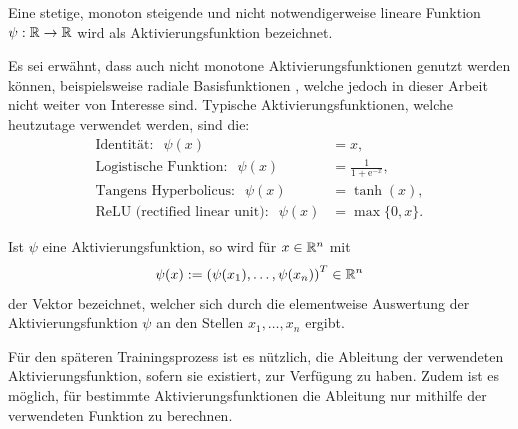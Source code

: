 \begin{defi}[Aktivierungsfunktion]
    \label{def_act_f}
    Eine stetige, monoton steigende und nicht notwendigerweise lineare Funktion $\psi: \mathbb{R} \rightarrow \mathbb{R}$ wird als Aktivierungsfunktion bezeichnet.
\end{defi}
Es sei erwähnt, dass auch nicht monotone Aktivierungsfunktionen genutzt werden können, beispielsweise radiale Basisfunktionen \cite{radialbasis}, welche jedoch in dieser Arbeit nicht weiter von Interesse sind.
Typische Aktivierungsfunktionen, welche heutzutage verwendet werden, sind die:
\begin{align*}
    \text{Identität}: \; \;\psi(x)&=x, \\
    \text{Logistische Funktion}: \; \;\psi(x)&=\frac{1}{1+\mathrm{e}^{-x}}, \\
    \text{Tangens Hyperbolicus}: \; \;\psi(x)&=\tanh(x), \\
    \text{ReLU (rectified linear unit)}: \; \;\psi(x)&=\max\{0,x\}.
\end{align*}

\begin{bem}
    Ist $\psi$ eine Aktivierungsfunktion, so wird für $x \in \mathbb{R}^n$ mit 
    \[\psi(x):=\left(\psi(x_1), \ldots, \psi(x_n)\right)^T \in \mathbb{R}^n
    \]
    der Vektor bezeichnet, welcher sich durch die elementweise Auswertung der Aktivierungsfunktion $\psi$ an den Stellen $x_1, \ldots, x_n$ ergibt. 
\end{bem}



Für den späteren Trainingsprozess ist es nützlich, die Ableitung der verwendeten Aktivierungsfunktion, sofern sie existiert, zur Verfügung zu haben. Zudem ist es möglich, für bestimmte Aktivierungsfunktionen die Ableitung nur mithilfe der verwendeten Funktion zu berechnen.

